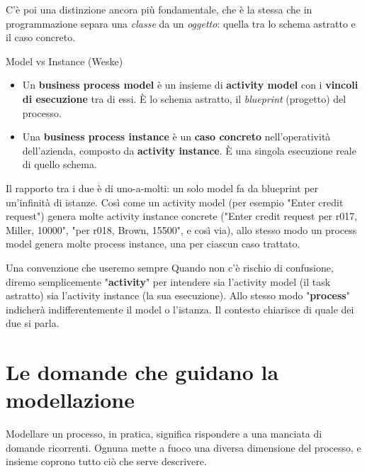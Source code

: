C'è poi una distinzione ancora più fondamentale, che è la stessa che in programmazione separa una \emph{classe} da un \emph{oggetto}: quella tra lo schema astratto e il caso concreto.

\begin{boxdefinition}{Model vs Instance (Weske)}
\begin{itemize}
\item Un \textbf{business process model} è un insieme di \textbf{activity model} con i \textbf{vincoli di esecuzione} tra di essi. È lo schema astratto, il \emph{blueprint} (progetto) del processo.
\item Una \textbf{business process instance} è un \textbf{caso concreto} nell'operatività dell'azienda, composto da \textbf{activity instance}. È una singola esecuzione reale di quello schema.
\end{itemize}
\end{boxdefinition}

Il rapporto tra i due è di uno-a-molti: un solo model fa da blueprint per un'infinità di istanze. Così come un activity model (per esempio "Enter credit request") genera molte activity instance concrete ("Enter credit request per r017, Miller, 10000", "per r018, Brown, 15500", e così via), allo stesso modo un process model genera molte process instance, una per ciascun caso trattato.

\begin{boxnote}{Una convenzione che useremo sempre}
Quando non c'è rischio di confusione, diremo semplicemente "\textbf{activity}" per intendere sia l'activity model (il task astratto) sia l'activity instance (la sua esecuzione). Allo stesso modo "\textbf{process}" indicherà indifferentemente il model o l'istanza. Il contesto chiarisce di quale dei due si parla.
\end{boxnote}

\section{\texorpdfstring{Le domande che guidano la modellazione}{Le domande che guidano la modellazione}}

Modellare un processo, in pratica, significa rispondere a una manciata di domande ricorrenti. Ognuna mette a fuoco una diversa dimensione del processo, e insieme coprono tutto ciò che serve descrivere.

